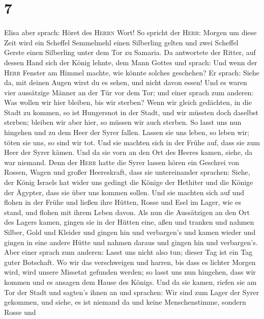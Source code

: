\hypertarget{section-6}{%
\section{7}\label{section-6}}

 Elisa aber sprach: Höret des \textsc{Herrn} Wort! So
spricht der \textsc{Herr}: Morgen um diese Zeit wird ein Scheffel
Semmelmehl einen Silberling gelten und zwei Scheffel Gerste einen
Silberling unter dem Tor zu Samaria.  Da antwortete der
Ritter, auf dessen Hand sich der König lehnte, dem Mann Gottes und
sprach: Und wenn der \textsc{Herr} Fenster am Himmel machte, wie könnte
solches geschehen? Er sprach: Siehe da, mit deinen Augen wirst du es
sehen, und nicht davon essen!  Und es waren vier
aussätzige Männer an der Tür vor dem Tor; und einer sprach zum anderen:
Was wollen wir hier bleiben, bis wir sterben?  Wenn wir
gleich gedächten, in die Stadt zu kommen, so ist Hungersnot in der
Stadt, und wir müssten doch daselbst sterben; bleiben wir aber hier, so
müssen wir auch sterben. So lasst uns nun hingehen und zu dem Heer der
Syrer fallen. Lassen sie uns leben, so leben wir; töten sie uns, so sind
wir tot.  Und sie machten sich in der Frühe auf, dass sie
zum Heer der Syrer kämen. Und da sie vorn an den Ort des Heeres kamen,
siehe, da war niemand.  Denn der \textsc{Herr} hatte die
Syrer lassen hören ein Geschrei von Rossen, Wagen und großer
Heereskraft, dass sie untereinander sprachen: Siehe, der König Israels
hat wider uns gedingt die Könige der Hethiter und die Könige der
Ägypter, dass sie über uns kommen sollen.  Und sie machten
sich auf und flohen in der Frühe und ließen ihre Hütten, Rosse und Esel
im Lager, wie es stand, und flohen mit ihrem Leben davon. 
Als nun die Aussätzigen an den Ort des Lagers kamen, gingen sie in der
Hütten eine, aßen und tranken und nahmen Silber, Gold und Kleider und
gingen hin und verbargen's und kamen wieder und gingen in eine andere
Hütte und nahmen daraus und gingen hin und verbargen's. 
Aber einer sprach zum anderen: Lasst uns nicht also tun; dieser Tag ist
ein Tag guter Botschaft. Wo wir das verschweigen und harren, bis dass es
lichter Morgen wird, wird unsere Missetat gefunden werden; so lasst uns
nun hingehen, dass wir kommen und es ansagen dem Hause des Königs.
 Und da sie kamen, riefen sie am Tor der Stadt und
sagten's ihnen an und sprachen: Wir sind zum Lager der Syrer gekommen,
und siehe, es ist niemand da und keine Menschenstimme, sondern Rosse und
